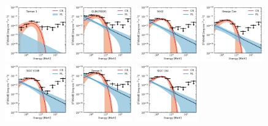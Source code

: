 \documentclass[doublespace,draft,nopageskip]{VTthesis} %
\begin{document}
\begin{appendices}
\begin{figure}
\includegraphics[width=0.24\textwidth]{Figures/Globular/spectra/2comp_27.pdf}
\includegraphics[width=0.24\textwidth]{Figures/Globular/spectra/2comp_1.pdf}
\includegraphics[width=0.24\textwidth]{Figures/Globular/spectra/2comp_11.pdf}
\includegraphics[width=0.24\textwidth]{Figures/Globular/spectra/2comp_6.pdf}
\includegraphics[width=0.24\textwidth]{Figures/Globular/spectra/2comp_15.pdf}
\includegraphics[width=0.24\textwidth]{Figures/Globular/spectra/2comp_29.pdf}
\includegraphics[width=0.24\textwidth]{Figures/Globular/spectra/2comp_3.pdf}
\end{figure}


\end{appendices}
\end{document}
